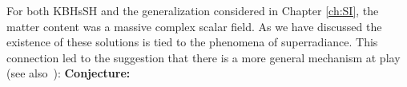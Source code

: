 %
%
%
For both KBHsSH and the generalization considered in Chapter \ref{ch:SI}, the matter content was a massive complex scalar field.
As we have discussed the existence of these solutions is tied to the phenomena of superradiance.
This connection led to the suggestion that there is a more general mechanism at play~\cite{Herdeiro:2014goa,Herdeiro:2014ima} (see also~\cite{Herdeiro:2015waa,Herdeiro:2015gia}): 
{\bf Conjecture:}

